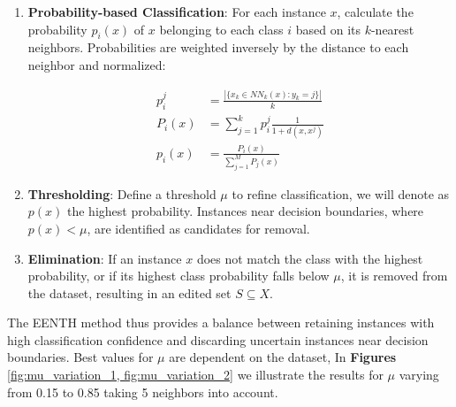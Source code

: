 \begin{enumerate}
	\item \textbf{Probability-based Classification}: For each instance $ x $, calculate the probability $ p_i(x) $ of $ x $ belonging to each class $ i $ based on its $k$-nearest neighbors. Probabilities are weighted inversely by the distance to each neighbor and normalized:
	
	
	\begin{center}
		\begin{align}
			p_i^j &= \frac{|\{x_k \in NN_k(x) : y_k=j \}|}{k} \\
			P_i(x) &= \sum_{j=1}^{k} p_i^j \frac{1}{1 + d(x, x^j)} \\
			p_i(x) &= \frac{P_i(x)}{\sum_{j=1}^{M} P_j(x)}
		\end{align}
	\end{center}
	
	
	\item \textbf{Thresholding}: Define a threshold $ \mu $ to refine classification, we will denote as $p(x)$ the highest probability. Instances near decision boundaries, where $ p(x) < \mu $, are identified as candidates for removal.
	
	\item \textbf{Elimination}: If an instance $ x $ does not match the class with the highest probability, or if its highest class probability falls below $ \mu $, it is removed from the dataset, resulting in an edited set $ S \subseteq X $.
\end{enumerate}

The EENTH method thus provides a balance between retaining instances with high classification confidence and discarding uncertain instances near decision boundaries. Best values for $\mu$ are dependent on the dataset, In \textbf{Figures} \ref{fig:mu_variation_1, fig:mu_variation_2} we illustrate the results for $\mu$ varying from 0.15 to 0.85 taking 5 neighbors into account.

